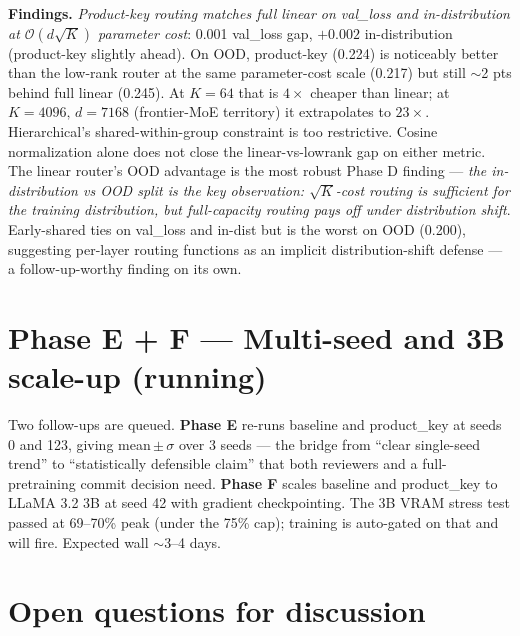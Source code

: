 \documentclass[10pt]{article}
\begin{document}
\textbf{Findings.} \emph{Product-key routing matches full linear on val\_loss and in-distribution at $\mathcal{O}(d\sqrt{K})$ parameter cost}: 0.001 val\_loss gap, $+0.002$ in-distribution (product-key slightly ahead). On OOD, product-key (0.224) is noticeably better than the low-rank router at the same parameter-cost scale (0.217) but still $\sim$2 pts behind full linear (0.245). At $K{=}64$ that is $4\times$ cheaper than linear; at $K{=}4096,\,d{=}7168$ (frontier-MoE territory) it extrapolates to $23\times$. Hierarchical's shared-within-group constraint is too restrictive. Cosine normalization alone does not close the linear-vs-lowrank gap on either metric. The linear router's OOD advantage is the most robust Phase D finding --- \emph{the in-distribution vs OOD split is the key observation: $\sqrt{K}$-cost routing is sufficient for the training distribution, but full-capacity routing pays off under distribution shift}. Early-shared ties on val\_loss and in-dist but is the worst on OOD (0.200), suggesting per-layer routing functions as an implicit distribution-shift defense --- a follow-up-worthy finding on its own.

\section*{Phase E + F --- Multi-seed and 3B scale-up (running)}

Two follow-ups are queued. \textbf{Phase E} re-runs baseline and product\_key at seeds 0 and 123, giving mean\,$\pm\,\sigma$ over 3 seeds --- the bridge from ``clear single-seed trend'' to ``statistically defensible claim'' that both reviewers and a full-pretraining commit decision need. \textbf{Phase F} scales baseline and product\_key to LLaMA 3.2 3B at seed 42 with gradient checkpointing. The 3B VRAM stress test passed at 69--70\% peak (under the 75\% cap); training is auto-gated on that and will fire. Expected wall $\sim$3--4 days.

\section*{Open questions for discussion}
\end{document}

